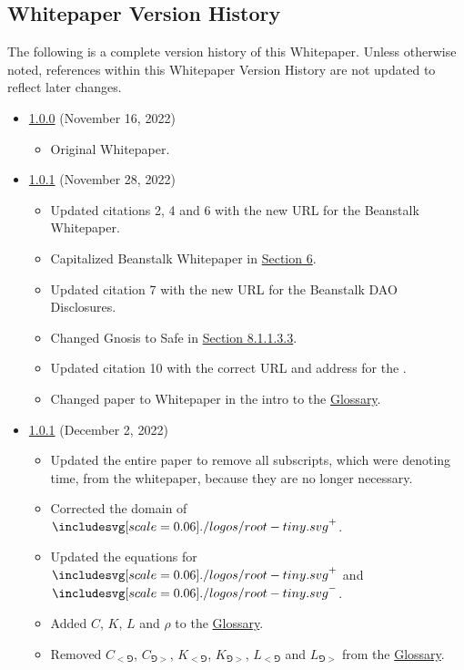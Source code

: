 \documentclass[class=article, crop=false]{standalone}
\begin{document}
\subsection{Whitepaper Version History}
The following is a complete version history of this Whitepaper. Unless otherwise noted, references within this Whitepaper Version History are not updated to reflect later changes.

\begin{itemize}[topsep=0pt, itemsep=3pt,leftmargin=16pt]
    \item \href{https://github.com/RootToken/Root-Whitepaper/blob/master/version-history/root1_0_0.pdf}{1.0.0} (November 16, 2022)
    \begin{itemize}
        \item Original Whitepaper.
    \end{itemize}
    \item \href{https://github.com/RootToken/Root-Whitepaper/blob/master/version-history/root1_0_1.pdf}{1.0.1} (November 28, 2022)
    \begin{itemize}
        \item Updated citations 2, 4 and 6 with the new URL for the Beanstalk Whitepaper.
        \item Capitalized Beanstalk Whitepaper in \hyperlink{section.6}{Section 6}.
        \item Updated citation 7 with the new URL for the Beanstalk DAO Disclosures.
        \item Changed Gnosis to Safe in \hyperlink{subparagraph.8.1.1.3.3}{Section 8.1.1.3.3}.
        \item Updated citation 10 with the correct URL and address for the .
        \item Changed paper to Whitepaper in the intro to the \hyperlink{subsection.8.2}{Glossary}.
    \end{itemize}
    \item \href{https://roottoken.org/root.pdf}{1.0.1} (December 2, 2022)
    \begin{itemize}
        \item Updated the entire paper to remove all subscripts, which were denoting time, from the whitepaper, because they are no longer necessary.
        \item Corrected the domain of $\Root^{+}$.
        \item Updated the equations for $\Root^{+}$ and $\Root^{-}$.
        \item Added $C$, $K$, $L$ and $\rho$ to the \hyperlink{subsection.8.3}{Glossary}. 
        \item Removed $C_{<\Game}$, $C_{\Game>}$, $K_{<\Game}$, $K_{\Game>}$, $L_{<\Game}$ and $L_{\Game>}$ from the \hyperlink{subsection.8.3}{Glossary}. 
    \end{itemize}
\end{itemize}
\end{document}
